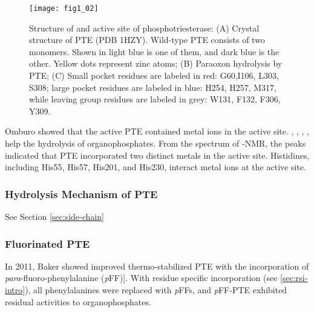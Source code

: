 \begin{refsection}
\begin{figure}[h!] \centering \texttt{[image: fig1\_02]}
    \caption[Structure of and active site of phosphotriesterase: (A) Crystal
    structure of PTE (PDB 1HZY). Wild-type PTE consists of two monomers. Shown
in light blue is one of them, and dark blue is the other. Yellow dots represent
zinc atoms; (B) Paraoxon hydrolysis by PTE; (C) Small pocket residues are
labeled in red: G60,I106, L303, S308; large pocket residues are labeled in
blue: H254, H257, M317, while leaving group residues are labeled in grey: W131,
F132, F306, Y309.] {Structure of and active site of phosphotriesterase: (A)
Crystal structure of PTE (PDB 1HZY). Wild-type PTE consists of two monomers.
Shown in light blue is one of them, and dark blue is the other. Yellow dots
represent zinc atoms; (B) Paraoxon hydrolysis by PTE;  (C) Small pocket
residues are labeled in red: G60,I106, L303, S308; large pocket residues are
labeled in blue: H254, H257, M317, while leaving group residues are labeled in
grey: W131, F132, F306, Y309.}
\label{fig:pte-structure} 
\end{figure} 

Omburo  showed that the active PTE contained metal ions in the
active site. , , , ,
 help the hydrolysis of organophosphates\cite{Omburo1992a}. From
the spectrum of -NMR, the peaks indicated that PTE incorporated
two distinct metals in the active site\cite{Omburo1993}. Histidines, including
His55, His57, His201, and His230, interact metal ions at the active
site\cite{Benning2001a}. 

\subsubsection{Hydrolysis Mechanism of PTE}

See Section \ref{sec:side-chain}

\subsubsection{Fluorinated PTE}

In 2011, Baker  showed improved thermo-stabilized PTE with the
incorporation of \emph{para}-fluoro-phenylalanine
(\emph{p}FF)]\cite{Baker2011b}. With residue specific incorporation (see
\ref{sec:rsi-intro}), all phenylalanines were replaced with \emph{p}FFs, and
\emph{p}FF-PTE exhibited residual activities to organophosphates.


\end{refsection}
